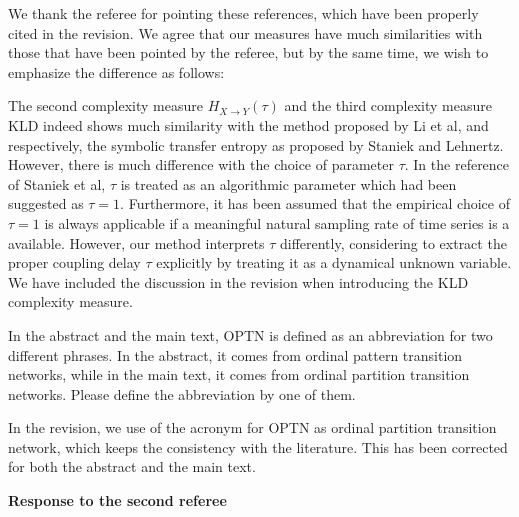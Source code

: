 \documentclass[aps,chaos,superscriptaddress,showkeys]{revtex4}
\begin{document}
\begin{center}
\begin{minipage}[c]{0.9\textwidth}
We thank the referee for pointing these references, which have been properly cited in the revision. We agree that our measures have much similarities with those that have been pointed by the referee, but by the same time, we wish to emphasize the difference as follows: 

The second complexity measure $H_{X \to Y}(\tau)$ and the third complexity measure KLD indeed shows much similarity with the method proposed by Li et al, and respectively, the symbolic transfer entropy as proposed by Staniek and Lehnertz. However, there is much difference with the choice of parameter $\tau$. In the reference of Staniek et al, $\tau$ is treated as an algorithmic parameter which had been suggested as $\tau = 1$. Furthermore, it has been assumed that the empirical choice of $\tau = 1$ is always applicable if a meaningful natural sampling rate of time series is a available. However, our method interprets $\tau$ differently, considering to extract the proper coupling delay $\tau$ explicitly by treating it as a dynamical unknown variable. We have included the discussion in the revision when introducing the KLD complexity measure. 
\end{minipage}
\end{center}


\noindent
{\sf In the abstract and the main text, OPTN is defined as an abbreviation for two different phrases. In the abstract, it comes from ordinal pattern transition networks, while in the main text, it comes from ordinal partition transition networks. Please define the abbreviation by one of them. }

\begin{center}
\begin{minipage}[c]{0.9\textwidth}
In the revision, we use of the acronym for OPTN as ordinal partition transition network, which keeps the consistency with the literature. This has been corrected for both the abstract and the main text. 
\end{minipage}
\end{center}

\vspace{0.4cm}
\begin{center}
{\bf Response to the second referee}
\end{center}


\end{document}
